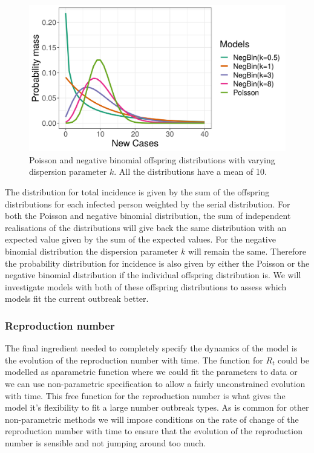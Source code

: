 \documentclass[12pt]{article}
\begin{document}
\begin{figure}[h]
  \centering
  \includegraphics[width=\textwidth]{../output/prob_dist.png}
  \caption{Poisson and negative binomial offspring distributions with varying dispersion parameter $k$. All the distributions have a mean of 10.}
  \label{fig:offspring}
\end{figure}

The distribution for total incidence is given by the sum of the offspring distributions for each infected person weighted by the serial distribution. For both the Poisson and negative binomial distribution, the sum of independent realisations of the distributions will give back the same distribution with an expected value given by the sum of the expected values. For the negative binomial distribution the dispersion parameter $k$ will remain the same. Therefore the probability distribution for incidence is also given by either the Poisson or the negative binomial distribution if the individual offspring distribution is. We will investigate models with both of these offspring distributions to assess which models fit the current outbreak better.

\subsubsection{Reproduction number}
The final ingredient needed to completely specify the dynamics of the model is the evolution of the reproduction number with time. The function for $R_t$ could be modelled as aparametric function where we could fit the parameters to data or we can use non-parametric specification to allow a fairly unconstrained evolution with time. This free function for the reproduction number is what gives the model it's flexibility to fit a large number outbreak types. As is common for other non-parametric methods we will impose conditions on the rate of change of the reproduction number with time to ensure that the evolution of the reproduction number is sensible and not jumping around too much.
\end{document}
